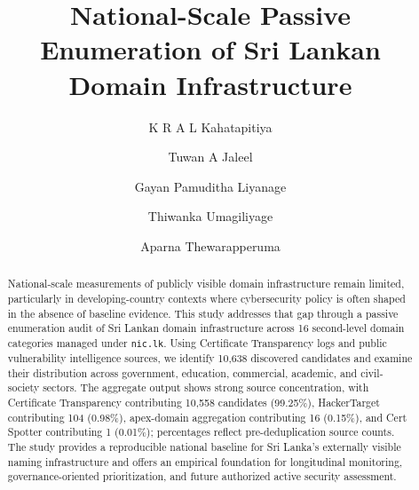\documentclass[preprint,review,12pt]{elsarticle}
\begin{document}
\begin{frontmatter}

\title{National-Scale Passive Enumeration of Sri Lankan Domain Infrastructure}

\author[addr1]{K R A L Kahatapitiya}

\author[addr2]{Tuwan A Jaleel}

\author[addr2]{Gayan Pamuditha Liyanage}

\author[addr2]{Thiwanka Umagiliyage}

\author[addr1,addr2]{Aparna Thewarapperuma}




\begin{abstract}
National-scale measurements of publicly visible domain infrastructure remain limited, particularly in developing-country contexts where cybersecurity policy is often shaped in the absence of baseline evidence. This study addresses that gap through a passive enumeration audit of Sri Lankan domain infrastructure across 16 second-level domain categories managed under \texttt{nic.lk}. Using Certificate Transparency logs and public vulnerability intelligence sources, we identify 10{,}638 discovered candidates and examine their distribution across government, education, commercial, academic, and civil-society sectors. The aggregate output shows strong source concentration, with Certificate Transparency contributing 10{,}558 candidates (99.25\%), HackerTarget contributing 104 (0.98\%), apex-domain aggregation contributing 16 (0.15\%), and Cert Spotter contributing 1 (0.01\%); percentages reflect pre-deduplication source counts. The study provides a reproducible national baseline for Sri Lanka's externally visible naming infrastructure and offers an empirical foundation for longitudinal monitoring, governance-oriented prioritization, and future authorized active security assessment.
\end{abstract}


\end{frontmatter}
\end{document}
